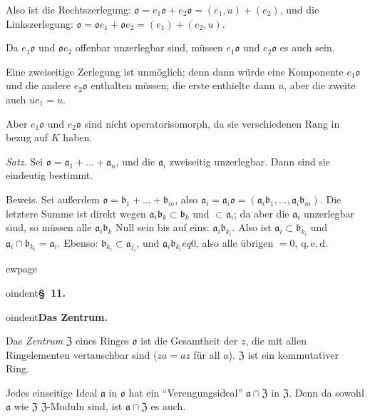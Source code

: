 \documentclass[12pt,a4paper]{article}
\newcommand{\ideala}{\mathfrak{a}}
\theoremstyle{definition}
\begin{document}
Also ist die Rechtszerlegung: $\mathfrak{o} = e_1\mathfrak{o} +
e_2\mathfrak{o} = (e_1, u) + (e_2)$, und die Linkszerlegung:
$\mathfrak{o} = \mathfrak{o}e_1 + \mathfrak{o}e_2 = (e_1) + (e_2, u)$.

Da $e_1\mathfrak{o}$ und $\mathfrak{o}e_2$ offenbar unzerlegbar sind,
m\"ussen $e_1\mathfrak{o}$ und $e_2\mathfrak{o}$ es auch sein.

Eine zweiseitige Zerlegung ist unm\"oglich; denn dann w\"urde eine
Komponente $e_1\mathfrak{o}$ und die andere $e_2\mathfrak{o}$ enthalten
m\"ussen; die erste enthielte dann $u$, aber die zweite auch $ue_1 = u$.

Aber $e_1\mathfrak{o}$ und $e_2\mathfrak{o}$ sind nicht operatorisomorph,
da sie verschiedenen Rang in bezug auf $K$ haben.

\medskip

\textit{Satz.} Sei $\mathfrak{o} = \mathfrak{a}_1 + \dots +
\mathfrak{a}_n$, und die $\mathfrak{a}_i$ zweiseitig unzerlegbar. Dann
sind sie eindeutig bestimmt.

Beweis. Sei au\ss erdem $\mathfrak{o} = \mathfrak{b}_1 + \dots +
\mathfrak{b}_m$, also $\mathfrak{a}_i = \mathfrak{a}_i\mathfrak{o} =
(\mathfrak{a}_i\mathfrak{b}_1, \dots, \mathfrak{a}_i\mathfrak{b}_m)$.
Die letztere Summe ist direkt wegen $\mathfrak{a}_i\mathfrak{b}_k \subset
\mathfrak{b}_k$ und $\subset \mathfrak{a}_i$; da aber die
$\mathfrak{a}_i$ unzerlegbar sind, so m\"ussen alle
$\mathfrak{a}_i\mathfrak{b}_k$ Null sein bis auf eins:
$\mathfrak{a}_i\mathfrak{b}_{k_i}$. Also ist $\mathfrak{a}_i \subset
\mathfrak{b}_{k_i}$ und $\mathfrak{a}_i \cap \mathfrak{b}_{k_i} =
\mathfrak{a}_i$. Ebenso: $\mathfrak{b}_{k_i} \subset \mathfrak{a}_{j_i}$,
und $\mathfrak{a}_i\mathfrak{b}_{k_i}  eq 0$, also alle \"ubrigen $= 0$,
q.\,e.\,d.



ewpage
\setcounter{page}{598}



oindent\textbf{\S~11.}



oindent\textbf{Das Zentrum.}

Das \textit{Zentrum} $\mathfrak{Z}$ eines Ringes $\mathfrak{o}$ ist die
Gesamtheit der $z$, die mit allen Ringelementen vertauschbar sind
($za = az$ f\"ur all $a$). $\mathfrak{Z}$ ist ein kommutativer Ring.

Jedes einseitige Ideal $\ideala$ in $\mathfrak{o}$ hat ein
``Verengungsideal'' $\ideala \cap \mathfrak{Z}$ in $\mathfrak{Z}$. Denn
da sowohl $\ideala$ wie $\mathfrak{Z}$ $\mathfrak{Z}$-Moduln sind, ist
$\ideala \cap \mathfrak{Z}$ es auch.
\end{document}
